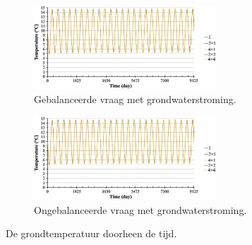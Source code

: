 \documentclass[a4paper,oneside,11pt]{report}
\numberwithin{figure}{section}
\numberwithin{table}{section}
\numberwithin{equation}{section}
\begin{document}
\begin{figure}[hbtp] 
\begin{subfigure}{0.75\textwidth}
	\centering
	\includegraphics[width=0.75\textwidth]{invlf_fig6a.jpg}
	\caption{Gebalanceerde vraag met grondwaterstroming.}
\end{subfigure}
\begin{subfigure}{0.75\textwidth}
	\centering
	\includegraphics[width=0.75\textwidth]{invlf_fig6a.jpg}
	\caption{Ongebalanceerde vraag met grondwaterstroming.}
\end{subfigure}
\label{fig:invlf_6}
\centering
\caption{De grondtemperatuur doorheen de tijd.}
\end{figure}
\end{document}
